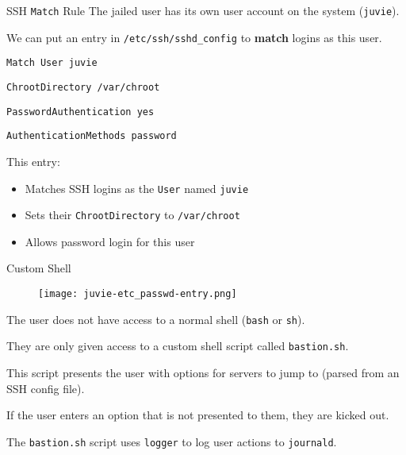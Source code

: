 \documentclass[14pt,compress,dvipsnames,aspectratio=169]{beamer} %
\begin{document}
\begin{frame}{SSH \texttt{Match} Rule}
    The jailed user has its own user account on the system (\texttt{juvie}).  

    \vspace{0.25cm}
    We can put an entry in \texttt{/etc/ssh/sshd\_config} to \textbf{match} logins
    as this user.  
    \vspace{0.25cm}

    \texttt{Match User juvie}

    \hspace{1.0cm}\texttt{ChrootDirectory /var/chroot}

    \hspace{1.0cm}\texttt{PasswordAuthentication yes}

    \hspace{1.0cm}\texttt{AuthenticationMethods password}

    \vspace{0.25cm}
    This entry:
    \begin{itemize}
        \item{Matches SSH logins as the \texttt{User} named \texttt{juvie}} 
        \item{Sets their \texttt{ChrootDirectory} to \texttt{/var/chroot}} 
        \item{Allows password login for this user} 
    \end{itemize}
\end{frame}

\begin{frame}{Custom Shell}
    \begin{figure}
        \centering
        \texttt{[image: juvie-etc\_passwd-entry.png]}
    \end{figure}
    The user does not have access to a normal shell (\texttt{bash} or \texttt{sh}).
    \vspace{0.25cm}

    They are only given access to a custom shell script called \texttt{bastion.sh}.  
    \vspace{0.25cm}

    This script presents the user with options for servers to jump to (parsed from an
    SSH config file).  
    \vspace{0.25cm}

    If the user enters an option that is not presented to them, they are kicked out.  
    \vspace{0.25cm}

    The \texttt{bastion.sh} script uses \texttt{logger} to log user actions to
    \texttt{journald}.  
\end{frame}
\end{document}
